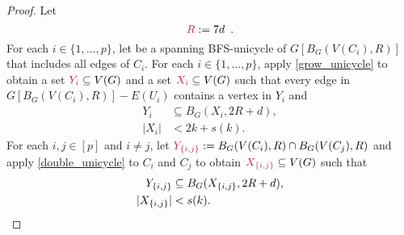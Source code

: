 \documentclass{patmorin}
\newcommand{\Oh}{\mathcal{O}}
\DeclarePairedDelimiter\set{\{}{\}}
\begin{document}
\begin{proof}
Let
\[
\mathdefin{R}:=7d\enspace .
\]
For each $i\in\{1,\ldots,p\}$, 
let  be a spanning BFS-unicycle of $G[B_G(V(C_i),R)]$ that includes all edges of $C_i$.
For each $i\in\{1,\ldots,p\}$, 
apply \cref{grow_unicycle} to obtain 
a set $\mathdefin{Y_i}\subseteq V(G)$ and 
a set $\mathdefin{X_i}\subseteq V(G)$ such that 
every edge in $G[B_G(V(C_i),R)]-E(U_i)$ contains a vertex in $Y_i$ and
\begin{align}
Y_i&\subseteq B_G(X_i,2R+d),\label{eq:Yi-contained-in-a-ball}\\
|X_i|&<2k+s(k).\label{eq:Xi-size}
\end{align}
For each $i,j\in[p]$ and $i\neq j$, let $\mathdefin{Y_{\set{i,j}}}:=B_G(V(C_i),R)\cap B_G(V(C_j),R)$ and apply \cref{double_unicycle} to $C_i$ and $C_j$ to obtain $\mathdefin{X_{\set{i,j}}}\subseteq V(G)$ such that 
\begin{align}
Y_{\set{i,j}}&\subseteq B_G(X_{\set{i,j}},2R+d), \label{eq:Yij-in-a-ball}\\
|X_{\set{i,j}}|&< s(k).\label{eq:Xij-size}
\end{align}


\end{proof}
\end{document}
